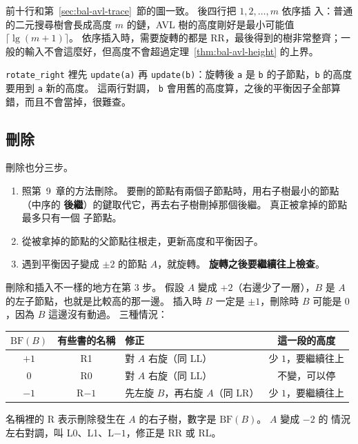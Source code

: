 前十行和第~\ref{sec:bal-avl-trace}~節的圖一致。 後四行把 $1, 2, \ldots, m$ 依序插
入：普通的二元搜尋樹會長成高度 $m$ 的鏈，AVL 樹的高度剛好是最小可能值
$\lceil \lg(m+1) \rceil$。 依序插入時，需要旋轉的都是 RR，最後得到的樹非常整齊；一般的輸入不會這麼好，但高度不會超過定理~\ref{thm:bal-avl-height} 的上界。

\texttt{rotate\_right} 裡先 \texttt{update(a)} 再 \texttt{update(b)}：旋轉後 \texttt{a}
是 \texttt{b} 的子節點，\texttt{b} 的高度要用到 \texttt{a} 新的高度。 這兩行對調，
\texttt{b} 會用舊的高度算，之後的平衡因子全部算錯，而且不會當掉，很難查。

\subsection{刪除}
\label{sec:bal-avl-delete}

刪除也分三步。

\begin{enumerate}
\item 照第~9~章的方法刪除。 要刪的節點有兩個子節點時，用右子樹最小的節點（中序的
\textbf{後繼}）的鍵取代它，再去右子樹刪掉那個後繼。 真正被拿掉的節點最多只有一個
子節點。
\item 從被拿掉的節點的父節點往根走，更新高度和平衡因子。
\item 遇到平衡因子變成 $\pm 2$ 的節點 $A$，就旋轉。 \textbf{旋轉之後要繼續往上檢查}。
\end{enumerate}

刪除和插入不一樣的地方在第 3 步。 假設 $A$ 變成 $+2$（右邊少了一層），$B$ 是 $A$
的左子節點，也就是比較高的那一邊。 插入時 $B$ 一定是 $\pm 1$，刪除時 $B$ 可能是
$0$，因為 $B$ 這邊沒有動過。 三種情況：

\begin{center}
\begin{tabular}{cclc}
\toprule
$\mathrm{BF}(B)$ & 有些書的名稱 & 修正 & 這一段的高度 \\
\midrule
$+1$ & R1 & 對 $A$ 右旋（同 LL） & 少 $1$，要繼續往上 \\
$0$ & R0 & 對 $A$ 右旋（同 LL） & 不變，可以停 \\
$-1$ & R$-1$ & 先左旋 $B$，再右旋 $A$（同 LR） & 少 $1$，要繼續往上 \\
\bottomrule
\end{tabular}
\end{center}

名稱裡的 R 表示刪除發生在 $A$ 的右子樹，數字是 $\mathrm{BF}(B)$。 $A$ 變成 $-2$ 的
情況左右對調，叫 L0、L1、L$-1$，修正是 RR 或 RL。

